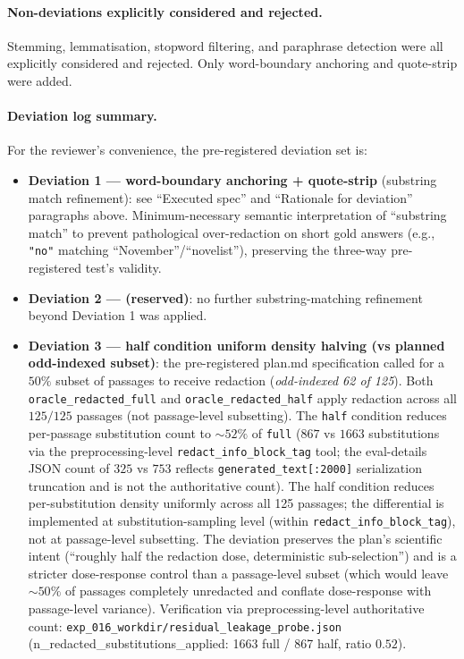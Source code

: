\paragraph{Non-deviations explicitly considered and rejected.}
Stemming, lemmatisation, stopword filtering, and paraphrase detection were all explicitly considered and rejected. Only word-boundary anchoring and quote-strip were added.

\paragraph{Deviation log summary.}
For the reviewer's convenience, the pre-registered deviation set is:
\begin{itemize}[leftmargin=*,nosep]
\item \textbf{Deviation 1 --- word-boundary anchoring + quote-strip} (substring match refinement): see ``Executed spec'' and ``Rationale for deviation'' paragraphs above. Minimum-necessary semantic interpretation of ``substring match'' to prevent pathological over-redaction on short gold answers (e.g., \texttt{"no"} matching ``November''/``novelist''), preserving the three-way pre-registered test's validity.
\item \textbf{Deviation 2 --- (reserved)}: no further substring-matching refinement beyond Deviation 1 was applied.
\item \textbf{Deviation 3 --- half condition uniform density halving (vs planned odd-indexed subset)}: the pre-registered plan.md specification called for a $50\%$ subset of passages to receive redaction (\emph{odd-indexed 62 of 125}). Both \texttt{oracle\_redacted\_full} and \texttt{oracle\_redacted\_half} apply redaction across all $125/125$ passages (not passage-level subsetting). The \texttt{half} condition reduces per-passage substitution count to $\sim 52\%$ of \texttt{full} ($867$ vs $1663$ substitutions via the preprocessing-level \texttt{redact\_info\_block\_tag} tool; the eval-details JSON count of $325$ vs $753$ reflects \texttt{generated\_text[:2000]} serialization truncation and is not the authoritative count). The half condition reduces per-substitution density uniformly across all 125 passages; the differential is implemented at substitution-sampling level (within \texttt{redact\_info\_block\_tag}), not at passage-level subsetting. The deviation preserves the plan's scientific intent (``roughly half the redaction dose, deterministic sub-selection'') and is a stricter dose-response control than a passage-level subset (which would leave $\sim 50\%$ of passages completely unredacted and conflate dose-response with passage-level variance). Verification via preprocessing-level authoritative count: \texttt{exp\_016\_workdir/residual\_leakage\_probe.json} (n\_redacted\_substitutions\_applied: 1663 full / 867 half, ratio $0.52$).

\end{itemize}
